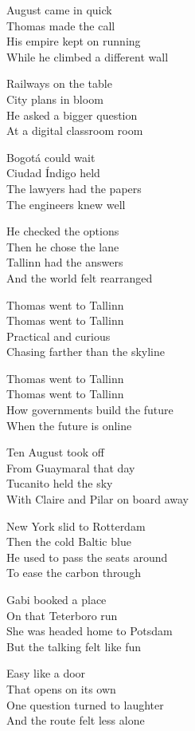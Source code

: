 \begin{lyrics}
August came in quick\\
Thomas made the call\\
His empire kept on running\\
While he climbed a different wall

Railways on the table\\
City plans in bloom\\
He asked a bigger question\\
At a digital classroom room

Bogotá could wait\\
Ciudad Índigo held\\
The lawyers had the papers\\
The engineers knew well

He checked the options\\
Then he chose the lane\\
Tallinn had the answers\\
And the world felt rearranged

Thomas went to Tallinn\\
Thomas went to Tallinn\\
Practical and curious\\
Chasing farther than the skyline

Thomas went to Tallinn\\
Thomas went to Tallinn\\
How governments build the future\\
When the future is online

Ten August took off\\
From Guaymaral that day\\
Tucanito held the sky\\
With Claire and Pilar on board away

New York slid to Rotterdam\\
Then the cold Baltic blue\\
He used to pass the seats around\\
To ease the carbon through

Gabi booked a place\\
On that Teterboro run\\
She was headed home to Potsdam\\
But the talking felt like fun

Easy like a door\\
That opens on its own\\
One question turned to laughter\\
And the route felt less alone


\end{lyrics}
